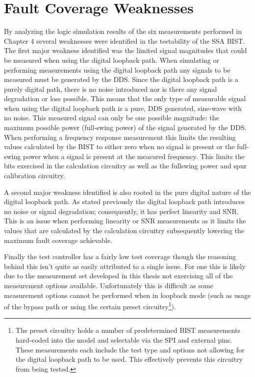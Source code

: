 \documentclass[12pt]{report}
\begin{document}
\section{Fault Coverage Weaknesses}
By analyzing the logic simulation results of the six measurements performed in Chapter 4 several weaknesses were identified in the testability of the SSA BIST.  The first major weakness identified was the limited signal magnitudes that could be measured when using the digital loopback path.  When simulating or performing measurements using the digital loopback path any signals to be measured must be generated by the DDS.  Since the digital loopback path is a purely digital path, there is no noise introduced nor is there any signal degradation or loss possible.  This means that the only type of measurable signal when using the digital loopback path is a pure, DDS generated, sine-wave with no noise.  This measured signal can only be one possible magnitude: the maximum possible power (full-swing power) of the signal generated by the DDS.  When performing a frequency response measurement this limits the resulting values calculated by the BIST to either zero when no signal is present or the full-swing power when a signal is present at the measured frequency.  This limits the bits exercised in the calculation circuitry as well as the fullswing power and spur calibration circuitry.

A second major weakness identified is also rooted in the pure digital nature of the digital loopback path.  As stated previously the digital loopback path introduces no noise or signal degradation; consequently, it has perfect linearity and SNR.  This is an issue when performing linearity or SNR measurements as it limits the values that are calculated by the calculation circuitry subsequently lowering the maximum fault coverage achievable.

Finally the test controller has a fairly low test coverage though the reasoning behind this isn't quite as easily attributed to a single issue.  For one this is likely due to the measurement set developed in this thesis not exercising all of the measurement options available.  Unfortunately this is difficult as some measurement options cannot be performed when in loopback mode (such as usage of the bypass path or using the certain preset circuitry\footnote{The preset circuitry holds a number of predetermined BIST measurements hard-coded into the model and selectable via the SPI and external pins.  These measurements each include the test type and options not allowing for the digital loopback path to be used.  This effectively prevents this circuitry from being tested.}).    
\end{document}
